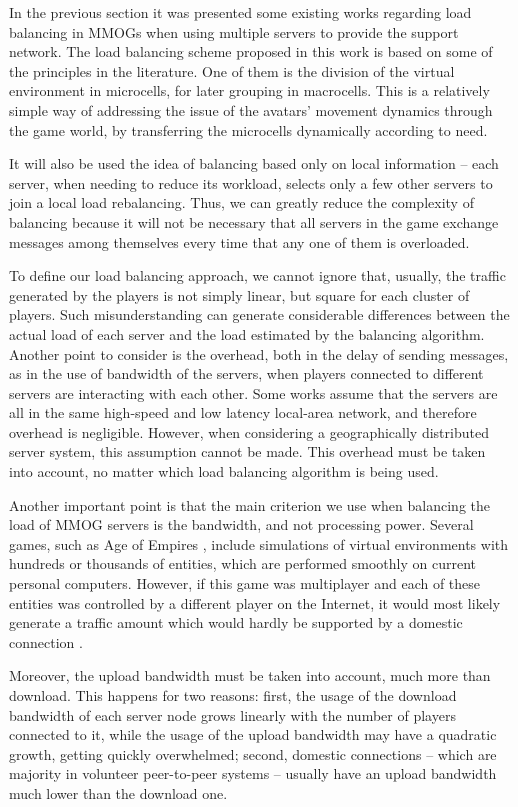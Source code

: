 In the previous section it was presented some existing works regarding load balancing in MMOGs when using multiple servers to provide the support network. The load balancing scheme proposed in this work is based on some of the principles in the literature. One of them is the division of the virtual environment in microcells, for later grouping in macrocells. This is a relatively simple way of addressing the issue of the avatars' movement dynamics through the game world, by transferring the microcells dynamically according to need.

It will also be used the idea of balancing based only on local information -- each server, when needing to reduce its workload, selects only a few other servers to join a local load rebalancing. Thus, we can greatly reduce the complexity of balancing because it will not be necessary that all servers in the game exchange messages among themselves every time that any one of them is overloaded.

To define our load balancing approach, we cannot ignore that, usually, the traffic generated by the players is not simply linear, but square for each cluster of players. Such misunderstanding can generate considerable differences between the actual load of each server and the load estimated by the balancing algorithm. Another point to consider is the overhead, both in the delay of sending messages, as in the use of bandwidth of the servers, when players connected to different servers are interacting with each other. Some works assume that the servers are all in the same high-speed and low latency local-area network, and therefore overhead is negligible. However, when considering a geographically distributed server system, this assumption cannot be made. This overhead must be taken into account, no matter which load balancing algorithm is being used.

Another important point is that the main criterion we use when balancing the load of MMOG servers is the bandwidth, and not processing power. Several games, such as Age of Empires \cite{ageofempires}, include simulations of virtual environments with hundreds or thousands of entities, which are performed smoothly on current personal computers. However, if this game was multiplayer and each of these entities was controlled by a different player on the Internet, it would most likely generate a traffic amount which would hardly be supported by a domestic connection \cite{feng2007wnn}.

Moreover, the upload bandwidth must be taken into account, much more than download. This happens for two reasons: first, the usage of the download bandwidth of each server node grows linearly with the number of players connected to it, while the usage of the upload bandwidth may have a quadratic growth, getting quickly overwhelmed; second, domestic connections -- which are majority in volunteer peer-to-peer systems -- usually have an upload bandwidth much lower than the download one.

